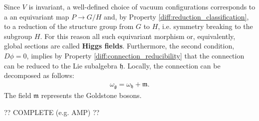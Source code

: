     Since $V$ is invariant, a well-defined choice of vacuum configurations corresponds to a an equivariant map $P\rightarrow G/H$ and, by Property \ref{diff:reduction_classification}, to a reduction of the structure group from $G$ to $H$, i.e. symmetry breaking to the subgroup $H$. For this reason all such equivariant morphism or, equivalently, global sections are called \textbf{Higgs fields}. Furthermore, the second condition, $D\phi=0$, implies by Property \ref{diff:connection_reducibility} that the connection can be reduced to the Lie subalgebra $\mathfrak{h}$. Locally, the connection can be decomposed as follows:
    \begin{gather}
        \omega_\mathfrak{g} = \omega_\mathfrak{h} + \mathfrak{m}.
    \end{gather}
    The field $\mathfrak{m}$ represents the Goldstone bosons.

    ?? COMPLETE (e.g. AMP) ??